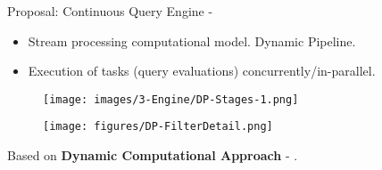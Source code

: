 \begin{frame}{Proposal: Continuous Query Engine - \DPATM}
\begin{itemize}
    \item Stream processing computational model. Dynamic Pipeline.
    \item Execution of tasks ({\small query evaluations}) concurrently/in-parallel.
\end{itemize}

\begin{figure}
    \hspace{-5.7cm}
    \centering
    \texttt{[image: images/3-Engine/DP-Stages-1.png]}
\end{figure}
\begin{figure}
    \centering
    \texttt{[image: figures/DP-FilterDetail.png]}
\end{figure}


Based on \textbf{Dynamic Computational Approach} - {\footnotesize \cite{Pasarella2024}}. 


\end{frame}

\begin{comment}
 Royo-Sales \cite{DP-bitriangles2021}
\end{comment}


